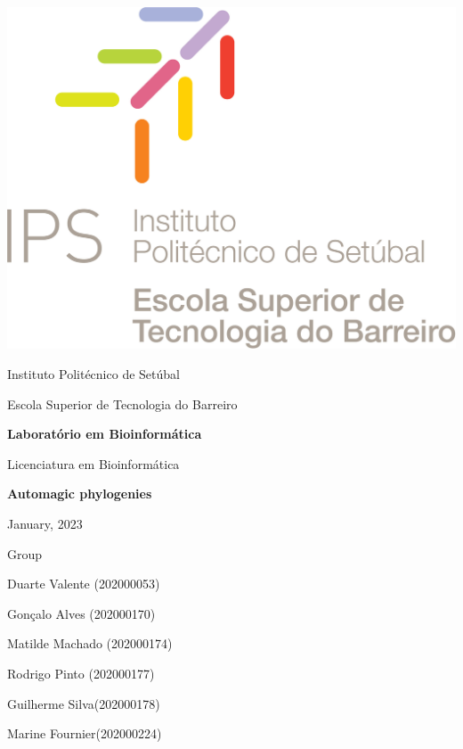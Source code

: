 \documentclass[12pt]{article}
\begin{document}
\thispagestyle{empty}
\begin{flushleft}
\includegraphics[scale=0.15]{ESTB.jpg}
\end{flushleft}

\begin{center}
\Large{Instituto Politécnico de Setúbal}
\end{center}

\begin{center}
\Large{Escola Superior de Tecnologia do Barreiro}
\end{center}

\medskip %


\begin{center}
\Large{\textbf{Laboratório em Bioinformática}}
\end{center}
\begin{center}
\Large{Licenciatura em Bioinformática}
\end{center}

\vspace{3cm} %

\begin{center}
\huge{\textbf{Automagic phylogenies}} 
\end{center}


\begin{center}
\Large{January, 2023}
\end{center}

\medskip
\begin{center}
\large{Group}

\large{Duarte Valente (202000053)}

\large{Gonçalo Alves (202000170)}

\large{Matilde Machado (202000174)}

\large{Rodrigo Pinto (202000177)}

\large{Guilherme Silva(202000178)}

\large{Marine Fournier(202000224)}
\end{center}
\end{document}
